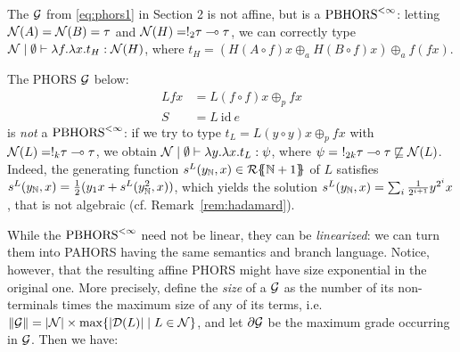 \begin{example}\label{ex:nonlin}
The $\mathcal{G}$ from \eqref{eq:phors1} in Section 2 is not affine, but is a $\text{PBHORS}^{<\infty}$: 
letting $\mathcal{N}(A)=\mathcal{N}(B)=\tau$ and $\mathcal{N}(H)=!_2\tau\multimap\tau$, we can correctly type  $\mathcal{N}\mid  \emptyset \vdash \lambda f. \lambda x.t_H: \mathcal{N}(H)$, where
$t_H= (H(A\circ f)x\oplus_a H(B\circ f)x)\oplus_a f(fx)$.

%
\end{example}


\begin{example}\label{ex:nonalg}
The PHORS $\mathcal{G}$ below:
\begin{align*}
Lfx &= L(f\circ f) x\oplus_{p} fx \\
S&= L\ \mathrm{id}\  e
\end{align*}
is \emph{not} a $\text{PBHORS}^{<\infty}$: if we try to type $t_L=L(y\circ y) x\oplus_{p} fx$
with $\mathcal{N}(L)=!_k\tau\multimap \tau$, we obtain
$\mathcal{N} \mid \emptyset\vdash \lambda y.\lambda x.t_L: \psi$, where $\psi=\ !_{2k}\tau\multimap \tau\not\sqsubseteq\mathcal{N}(L)$. 
Indeed, the generating function $s^L(y_{\mathbb{N}},x)\in {\mathcal{R}}\{\!\!\{\mathbb{N}+1\}\!\!\}$ of $L$ satisfies 
$s^L(y_{\mathbb{N}},x)=\frac{1}{2}(
y_1x+s^L( y^2_{\mathbb{N}},x)
)$, which yields the solution $s^L(y_{\mathbb{N}},x)=\sum_i\frac{1}{2^{i+1}}y^{2^i}x$, that is not algebraic (cf. Remark~\ref{rem:hadamard}). 
\end{example}



%


While the $\text{PBHORS}^{<\infty}$ need not be linear, they can be \emph{linearized}:
we can turn them into PAHORS having the same semantics and branch language. Notice, however, that the resulting affine PHORS might have size exponential in the original one.
More precisely, define the \emph{size} of a $\mathcal{G}$ as the number of its non-terminals times the maximum size of any of its terms, i.e.~$\|\mathcal{G}\|=|\mathcal{N}|\times\max\{|\mathcal{D}(L)|\mid L\in\mathcal{N}\}$, and let $\partial\mathcal{G}$ be the maximum grade occurring in $\mathcal{G}$. Then we have:

